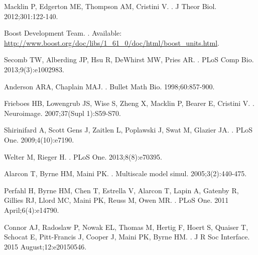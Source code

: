 \documentclass[10pt,letterpaper]{article}
\begin{document}
\begin{thebibliography}{10}
Macklin P, Edgerton ME, Thompson AM, Cristini V.
.
\newblock J Theor Biol. 2012;301:122-140.

Boost Development Team.
.
\newblock Available: \url{http://www.boost.org/doc/libs/1_61_0/doc/html/boost_units.html}.

Secomb TW, Alberding JP, Hsu R, DeWhirst MW, Pries AR.
.
\newblock PLoS Comp Bio. 2013;9(3):e1002983.

Anderson ARA, Chaplain MAJ.
.
\newblock Bullet Math Bio. 1998;60:857-900.

Frieboes HB, Lowengrub JS, Wise S, Zheng X, Macklin P, Bearer E, Cristini V.
.
\newblock Neuroimage. 2007;37(Supl 1):S59-S70.

Shirinifard A, Scott Gens J, Zaitlen L, Poplawski J, Swat M, Glazier JA.
.
\newblock PLoS One. 2009;4(10):e7190.

Welter M, Rieger H.
.
\newblock PLoS One. 2013;8(8):e70395.

Alarcon T, Byrne HM, Maini PK.
.
\newblock Multiscale model simul. 2005;3(2):440-475.

Perfahl H, Byrne HM, Chen T, Estrella V, Alarcon T, Lapin A, Gatenby R, Gillies RJ, Llord MC, Maini PK, Reuss M, Owen MR.
.
\newblock PLoS One. 2011 April;6(4):e14790.

Connor AJ, Radoslaw P, Nowak EL, Thomas M, Hertig F, Hoert S, Quaiser T, Schocat E, Pitt-Francis J, Cooper J, Maini PK, Byrne HM.
.
\newblock J R Soc Interface. 2015 August;12:e20150546.


\end{thebibliography}
\end{document}
